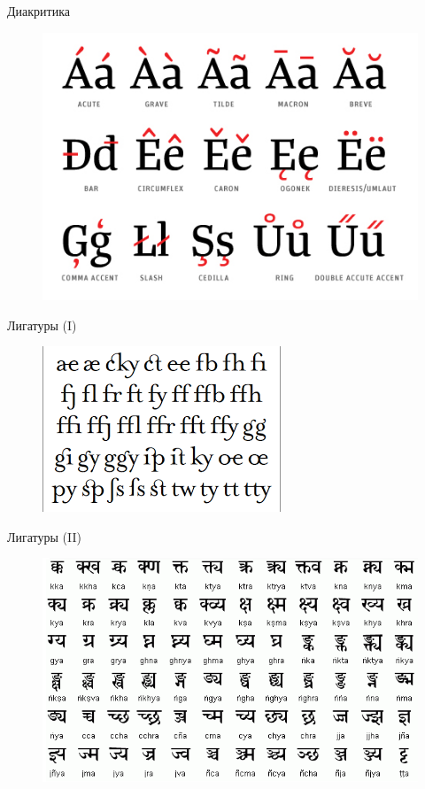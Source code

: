 \documentclass{beamer}
\begin{document}
\begin{frame}{Диакритика}
\begin{figure}[H]
\includegraphics[scale=0.45]{diacritic.png} 
\end{figure}
\end{frame}

\begin{frame}{Лигатуры (I)}
\begin{figure}[H]
\includegraphics[scale=0.8]{ligatura.png} 
\end{figure}
\end{frame}

\begin{frame}{Лигатуры (II)}
\begin{figure}[H]
\includegraphics[scale=0.5]{devanagari.png} 
\end{figure}
\end{frame}
\end{document}

